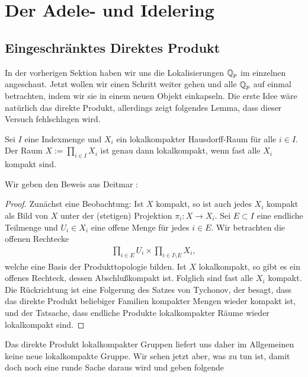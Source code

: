 \section{Der Adele- und Idelering}
	
\subsection{Eingeschränktes Direktes Produkt}\label{kapitel:RDP}
		In der vorherigen Sektion haben wir uns die Lokalisierungen ${\mathbb{Q}_p}$ im einzelnen angeschaut. Jetzt wollen wir einen Schritt weiter gehen und alle ${\mathbb{Q}_p}$ auf einmal betrachten, indem wir sie in einem neuen Objekt einkapseln. Die erste Idee wäre natürlich das direkte Produkt, allerdings zeigt folgendes Lemma, dass dieser Versuch fehlschlagen wird.
		\begin{lemma}\label{Lemma:lokalkompaktProd}
			Sei $I$ eine Indexmenge und $X_i$ ein lokalkompakter Hausdorff-Raum für alle $i \in I$. Der Raum $X:=\prod_{i \in I} X_i$ ist genau dann lokalkompakt, wenn fast alle $X_i$ kompakt sind.
		\end{lemma}
		Wir geben den Beweis aus Deitmar \cite{deitmar2010}:
		\begin{proof}
			Zunächst eine Beobachtung: Ist $X$ kompakt, so ist auch jedes $X_i$ kompakt als Bild von $X$ unter der (stetigen) Projektion $\pi_i:X \to X_i$.
			Sei $E \subset I$ eine endliche Teilmenge und $U_i \in X_i$ eine offene Menge für jedes $i \in E$. Wir betrachten die offenen Rechtecke
			\begin{align*}
				\prod_{i \in E} U_i \times \prod_{i \in I\setminus E} X_i,
			\end{align*}
			welche eine Basis der Produkttopologie bilden. Ist $X$ lokalkompakt, so gibt es ein offenes Rechteck, dessen Abschlu\ss kompakt ist. 
			Folglich sind fast alle $X_i$ kompakt. 
			Die Rückrichtung ist eine Folgerung des Satzes von Tychonov, der besagt, dass das direkte Produkt beliebiger Familien kompakter Mengen wieder kompakt ist, und der Tatsache, dass endliche Produkte lokalkompakter Räume wieder lokalkompakt sind.
		\end{proof}
		Das direkte Produkt lokalkompakter Gruppen liefert uns daher im Allgemeinen keine neue lokalkompakte Gruppe. Wir sehen jetzt aber, was zu tun ist, damit doch noch eine runde Sache daraus wird und geben folgende
